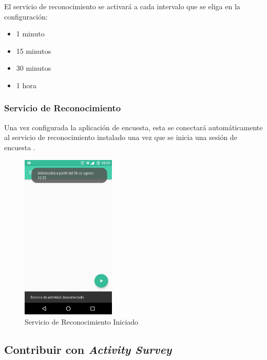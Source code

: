 {El servicio de reconocimiento se activará a cada intervalo que se eliga en la configuración:
\begin{itemize}
\item {} 
1 minuto

\item {} 
15 minutos

\item {} 
30 minutos

\item {} 
1 hora

\end{itemize}

\subsubsection{Servicio de Reconocimiento}
\label{config:servicio-de-reconocimiento-activado}
Una vez configurada la aplicación de encuesta, esta se conectará automáticamente al servicio de reconocimiento instalado una vez que se inicia una sesión de encuesta .
\begin{figure}[!h]
\centering

    \includegraphics[width=0.4\textwidth]{anexos/graphics/app_started.jpg}
\caption{Servicio de Reconocimiento Iniciado}\label{config:id3}\end{figure}


\subsection{Contribuir con \emph{Activity Survey}}
\label{contrib:har-contrib}\label{contrib::doc}\label{contrib:contribuir-con-activity-survey}

}
